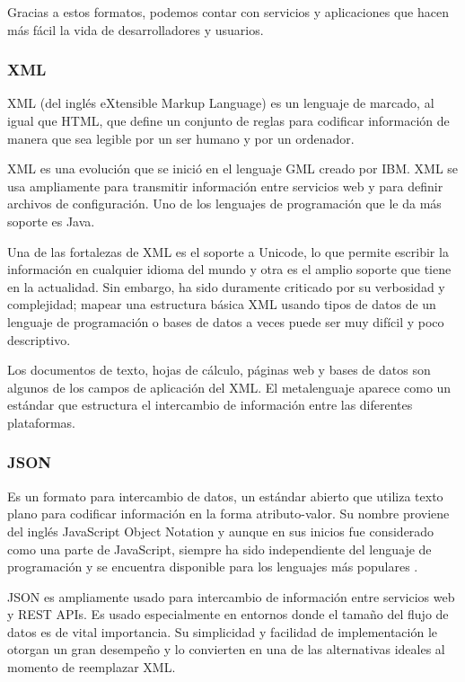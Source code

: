 Gracias a estos formatos, podemos contar con servicios y aplicaciones que hacen más fácil la vida de desarrolladores y usuarios.

\subsubsection{XML}

XML (del inglés eXtensible Markup Language) es un lenguaje de marcado, al igual que HTML, que define un conjunto de reglas para codificar información de manera que sea legible por un ser humano y por un ordenador.

XML es una evolución que se inició en el lenguaje GML creado por IBM. XML se usa ampliamente para transmitir información entre servicios web y para definir archivos de configuración. Uno de los lenguajes de programación que le da más soporte es Java.

Una de las fortalezas de XML es el soporte a Unicode, lo que permite escribir la información en cualquier idioma del mundo y otra es el amplio soporte que tiene en la actualidad. Sin embargo, ha sido duramente criticado por su verbosidad y complejidad; mapear una estructura básica XML usando tipos de datos de un lenguaje de programación o bases de datos a veces puede ser muy difícil y poco descriptivo.

Los documentos de texto, hojas de cálculo, páginas web y bases de datos son algunos de los campos de aplicación del XML. El metalenguaje aparece como un estándar que estructura el intercambio de información entre las diferentes plataformas.

\subsubsection{JSON}

Es un formato para intercambio de datos, un estándar abierto que utiliza texto plano para codificar información en la forma atributo-valor. Su nombre proviene del inglés JavaScript Object Notation y aunque en sus inicios fue considerado como una parte de JavaScript, siempre ha sido independiente del lenguaje de programación y se encuentra disponible para los lenguajes más populares \cite{formato3}.

JSON es ampliamente usado para intercambio de información entre servicios web y REST APIs. Es usado especialmente en entornos donde el tamaño del flujo de datos es de vital importancia. Su simplicidad y facilidad de implementación le otorgan un gran desempeño y lo convierten en una de las alternativas ideales al momento de reemplazar XML.

